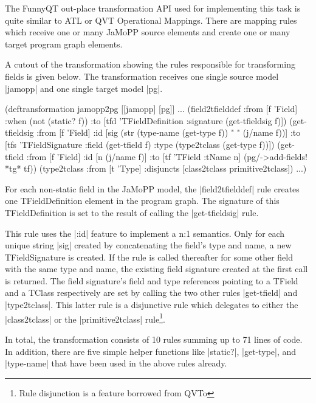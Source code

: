 \documentclass[submission]{eptcs}
\newcommand{\code}{\clojureinline}
\begin{document}
The FunnyQT out-place transformation API used for implementing this task is
quite similar to ATL or QVT Operational Mappings.  There are mapping rules
which receive one or many JaMoPP source elements and create one or many target
program graph elements.

A cutout of the transformation showing the rules responsible for transforming
fields is given below.  The transformation receives one single source model
\code|jamopp| and one single target model \code|pg|.

\begin{clojurecode}
(deftransformation jamopp2pg [[jamopp] [pg]]
  ...
  (field2tfielddef
   :from [f 'Field]
   :when (not (static? f))
   :to   [tfd 'TFieldDefinition {:signature (get-tfieldsig f)}])
  (get-tfieldsig
   :from [f 'Field]
   :id   [sig (str (type-name (get-type f)) " " (j/name f))]
   :to   [tfs 'TFieldSignature {:field (get-tfield f)
                                :type  (type2tclass (get-type f))}])
  (get-tfield
   :from [f 'Field]
   :id   [n (j/name f)]
   :to   [tf 'TField {:tName n}]
   (pg/->add-fields! *tg* tf))
  (type2tclass
   :from [t 'Type]
   :disjuncts [class2tclass primitive2tclass])
  ...)
\end{clojurecode}

For each non-static field in the JaMoPP model, the \code|field2tfielddef| rule
creates one \textsf{TFieldDefinition} element in the program graph.  The
signature of this \textsf{TFieldDefinition} is set to the result of calling the
\code|get-tfieldsig| rule.

This rule uses the \code|:id| feature to implement a n:1 semantics.  Only for
each unique string \code|sig| created by concatenating the field's type and
name, a new \textsf{TFieldSignature} is created.  If the rule is called
thereafter for some other field with the same type and name, the existing field
signature created at the first call is returned.  The field signature's
\textsf{field} and \textsf{type} references pointing to a \textsf{TField} and a
\textsf{TClass} respectively are set by calling the two other rules
\code|get-tfield| and \code|type2tclass|.  This latter rule is a disjunctive
rule which delegates to either the \code|class2tclass| or the
\code|primitive2tclass| rule\footnote{Rule disjunction is a feature borrowed
  from QVTo}.

In total, the transformation consists of 10 rules summing up to 71 lines of
code.  In addition, there are five simple helper functions like \code|static?|,
\code|get-type|, and \code|type-name| that have been used in the above rules
already.
\end{document}
